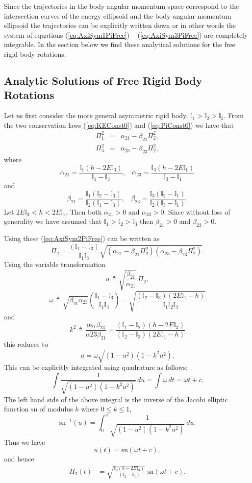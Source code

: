 \documentclass[graybox,envcountchap,sectrefs]{svmonoMuga}
\begin{document}
Since the trajectories in the body angular momentum space correspond to the intersection curves of the energy ellipsoid and the body angular momentum ellipsoid the trajectories can be explicitly written down or in other words the system of equations (\ref{eq:AxiSym1PiFree}) -- (\ref{eq:AxiSym3PiFree}) are  completely integrable. In the section below we find these analytical solutions for the free rigid body rotations.
\subsection{Analytic Solutions of Free Rigid Body Rotations}\label{Secn:IntegrabilityFreeRotations}
Let us first consider the more general asymmetric rigid body, $\mathbb{I}_1>\mathbb{I}_2>\mathbb{I}_3$.
From the two conservation laws (\ref{eq:KEConst0}) and (\ref{eq:PiConst0}) we have that
\begin{eqnarray}
\Pi^2_1 &=&\alpha_{21}-\beta_{21} \Pi^2_2, \label{eq:Pi1}\\
\Pi^2_3 &=&\alpha_{23}-\beta_{23} \Pi^2_2,\label{eq:Pi2}
\end{eqnarray}
where
\[
\alpha_{21}=\frac{\mathbb{I}_1(h-2E\mathbb{I}_3)}{\mathbb{I}_1-\mathbb{I}_3},\:\:\:\:\alpha_{23}=\frac{\mathbb{I}_3(h-2E\mathbb{I}_1)}{\mathbb{I}_3-\mathbb{I}_1}
\]
and
\[
\beta_{21}=\frac{\mathbb{I}_1(\mathbb{I}_2-\mathbb{I}_3)}{\mathbb{I}_2(\mathbb{I}_1-\mathbb{I}_3)},\:\:\:\:\beta_{23}=\frac{\mathbb{I}_3(\mathbb{I}_2-\mathbb{I}_1)}{\mathbb{I}_2(\mathbb{I}_3-\mathbb{I}_1)}.
\]
Let $2E\mathbb{I}_3<h<2E\mathbb{I}_1$. Then both $\alpha_{21}>0$ and $\alpha_{23}>0$.
Since without loss of generality we have assumed that $\mathbb{I}_1>\mathbb{I}_2>\mathbb{I}_3$ then $\beta_{21}>0$ and $\beta_{23}>0$.

Using these (\ref{eq:AxiSym2PiFree}) can be written as
\[
\dot{\Pi}_2  =  \frac{(\mathbb{I}_1-\mathbb{I}_3)}{\mathbb{I}_1 \mathbb{I}_3}\sqrt{(\alpha_{21}-\beta_{21} \Pi^2_2)(\alpha_{23}-\beta_{23} \Pi^2_2)}.
\]
Using the variable transformation
\[u
\triangleq \sqrt{\frac{\beta_{21}}{\alpha_{21}}}\,\Pi_2,
\]
\[
\omega\triangleq \sqrt{\beta_{21}\alpha_{23}}\left(\frac{\mathbb{I}_1-\mathbb{I}_3}{\mathbb{I}_1\mathbb{I}_3}\right)=\sqrt{\frac{(\mathbb{I}_2-\mathbb{I}_3)(2E\mathbb{I}_1-h)}{\mathbb{I}_1\mathbb{I}_2\mathbb{I}_3}}
\]
and
\[
k^2\triangleq \frac{\alpha_{21}\beta_{23}}{\alpha{23}\beta_{21}}=\frac{(\mathbb{I}_1-\mathbb{I}_2)(h-2E\mathbb{I}_3)}{(\mathbb{I}_2-\mathbb{I}_3)(2E\mathbb{I}_1-h)}
\]
this reduces to
\[
\dot{u}  =  \omega\sqrt{(1-u^2)(1-k^2u^2)}.
\]
This can be explicitly integrated using quadrature as follows:
\[
\int \frac{1}{\sqrt{(1-u^2)(1-k^2u^2)}}\,du =  \int \omega \,dt=\omega t +c.
\]
The left hand side of the above integral is the inverse of the Jacobi elliptic function $\mathrm{sn}$ of modulus $k$ where $0\leq k \leq 1$,
\[
\mathrm{sn}^{-1}(u)=\int_0^u \frac{1}{\sqrt{(1-u^2)(1-k^2u^2)}}\,du.
\]
Thus we have
\[
u(t)=\mathrm{sn}(\omega t +c),
\]
and hence
\begin{align}
\Pi_2(t)&=\sqrt{\frac{\mathbb{I}_2(h-2E\mathbb{I}_3)}{(\mathbb{I}_2-\mathbb{I}_3)}}\;\mathrm{sn}(\omega t +c).
\label{eq:Pi22}\\\
\end{align}
\end{document}

